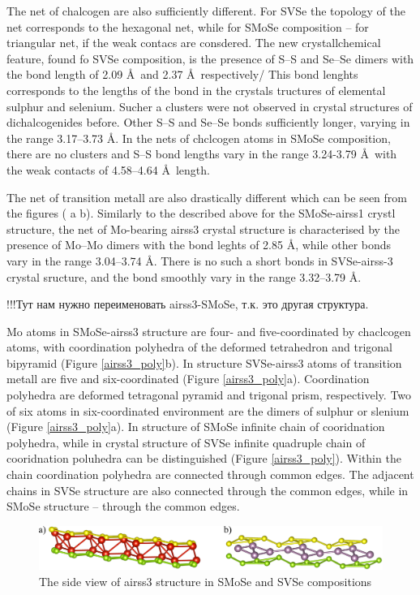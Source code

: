 \documentclass[a4paperm]{article}
\begin{document}
The net of chalcogen are also sufficiently different.
For SVSe the topology of the net corresponds to the hexagonal net, while for SMoSe composition – for triangular net, if the weak contacs are consdered.
The new crystallchemical feature, found fo SVSe composition, is the presence of S--S and Se--Se dimers with the bond length of 2.09 \AA\ and 2.37 \AA\, respectively/
This bond lenghts corresponds to the lengths of the bond in the crystals tructures of elemental sulphur and selenium.
Sucher a clusters were not observed in crystal structures of dichalcogenides before.
Other S--S and Se--Se bonds sufficiently longer, varying in the range 3.17--3.73 \AA.
In the nets of chclcogen atoms in SMoSe composition, there are no clusters and S--S bond lengths vary in the range 3.24-3.79 \AA\ with the weak contacts of 4.58--4.64 \AA\ length.

The net of transition metall are also drastically different which can be seen from the figures ( a  b).
Similarly to the described above for the SMoSe-airss1 crystl structure, the net of Mo-bearing airss3 crystal structure is characterised by the presence of Mo--Mo dimers with the bond leghts of 2.85 \AA, while other bonds vary in the range 3.04--3.74 \AA.
There is no such a short bonds in SVSe-airss-3 crystal sructure, and the bond smoothly vary in the range 3.32--3.79 \AA.

!!!Тут нам нужно переименовать airss3-SMoSe, т.к. это другая структура.


Mo atoms in SMoSe-airss3 structure are four- and five-coordinated by chaclcogen atoms, with coordination polyhedra of the deformed tetrahedron and trigonal bipyramid (Figure \ref{airss3_poly}b).
In structure SVSe-airss3 atoms of transition metall are five and six-coordinated (Figure \ref{airss3_poly}a).
Coordination polyhedra are  deformed tetragonal pyramid and trigonal prism, respectively.
Two of six atoms in six-coordinated environment are the dimers of sulphur or slenium (Figure \ref{airss3_poly}a).
In structure of SMoSe infinite chain of cooridnation polyhedra, while in crystal structure of SVSe infinite quadruple chain of cooridnation poluhedra can be distinguished (Figure \ref{airss3_poly}).
Within the chain coordination polyhedra are connected through common edges.
The adjacent chains in SVSe structure are also connected through the common edges, while in SMoSe structure – through the common edges.

\begin{figure}[H]
	\includegraphics[width=\textwidth]{airss3_side.png}
	\caption{The side view of airss3 structure in SMoSe and SVSe compositions}
	\label{airss3_side}
\end{figure}
\end{document}

